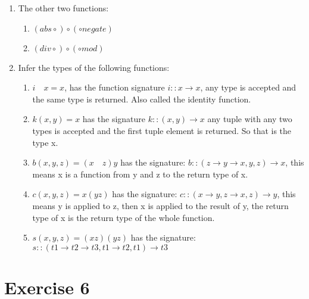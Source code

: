\documentclass{article}
\begin{document}
\begin{enumerate}
\begin{enumerate}
    \end{enumerate}
    \item The other two functions:
    \begin{enumerate}
        \item $(abs \circ) \circ (\circ negate)$
        \item $(div \circ) \circ (\circ mod)$ 
    \end{enumerate}
    \item Infer the types of the following functions:
    \begin{enumerate}
        \item $i \quad x = x$, has the function signature $i::x \rightarrow x$, any type is accepted and the same type is returned. Also called the identity function. 
        \item $k (x, y) = x$ has the signature $k::(x , y) \rightarrow x$ any tuple with any two types is accepted and the first tuple element is returned. So that is the type x. 
        \item $b (x, y, z) = (x \quad z) y$ has the signature: $b :: (z \rightarrow y \rightarrow x, y, z) \rightarrow x$, this means x is a function from y and z to the return type of x.
        \item $c (x, y, z) = x (y z)$ has the signature: $c::(x \rightarrow y, z \rightarrow x, z) \rightarrow y$, this means y is applied to z, then x is applied to the result of y, the return type of x is the return type of the whole function.  
        \item $s (x, y, z) = (x z) (y z)$ has the signature: $s::(t1 \rightarrow t2 \rightarrow t3, t1 \rightarrow t2, t1) \rightarrow t3$
    \end{enumerate}
\end{enumerate}

\section*{Exercise 6}
\end{document}
